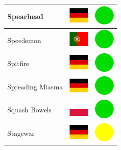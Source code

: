 \documentclass[12pt, a4paper, twoside]{report}
\begin{document}
\begin{center}
\begin{longtable}{|p{5cm}|p{2cm}|p{2cm}|}
 Spearhead                                                  & \includegraphics[width=1cm]{../4x3/de} &   \includegraphics[width=1cm]{../likes/y} \\ \hline
 Speedemon                                                  & \includegraphics[width=1cm]{../4x3/pt} &   \includegraphics[width=1cm]{../likes/y} \\ \hline
 Spitfire                                                   & \includegraphics[width=1cm]{../4x3/de} &   \includegraphics[width=1cm]{../likes/y} \\ \hline
 Spreading Miasma                                           & \includegraphics[width=1cm]{../4x3/de} &   \includegraphics[width=1cm]{../likes/y} \\ \hline
 Squash Bowels                                              & \includegraphics[width=1cm]{../4x3/pl} &   \includegraphics[width=1cm]{../likes/y} \\ \hline
 Stagewar                                                   & \includegraphics[width=1cm]{../4x3/de} &   \includegraphics[width=1cm]{../likes/m} \\ \hline

\end{longtable}
\end{center}
\end{document}
